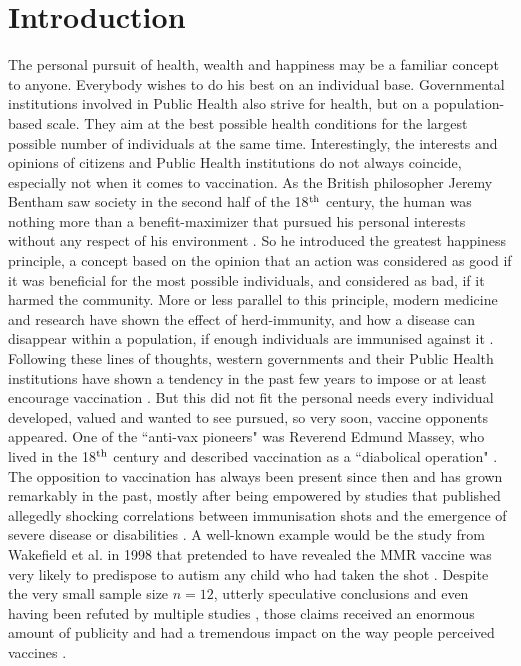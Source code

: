 \documentclass[12pt,a4paper,twoside]{article}
\begin{document}
\newpage

\listoffigures

\newpage

\section{Introduction}

The personal pursuit of health, wealth and happiness may be a familiar concept to anyone. Everybody wishes to do his best on an individual base. Governmental institutions involved in Public Health also strive for health, but on a population-based scale. They aim at the best possible health conditions for the largest possible number of individuals at the same time. Interestingly, the interests and opinions of citizens and Public Health institutions do not always coincide, especially not when it comes to vaccination. As the British philosopher Jeremy Bentham saw society in the second half of the 18$^{\textnormal{th}}$ century, the human was nothing more than a benefit-maximizer that pursued his personal interests without any respect of his environment \cite{Bentham1988}. So he introduced the greatest happiness principle, a concept based on the opinion that an action was considered as good if it was beneficial for the most possible individuals, and considered as bad, if it harmed the community. More or less parallel to this principle, modern medicine and research have shown the effect of herd-immunity, and how a disease can disappear within a population, if enough individuals are immunised against it \cite{Gordis2014}. Following these lines of thoughts, western governments and their Public Health institutions have shown a tendency in the past few years to impose or at least encourage vaccination \cite{KBV2019, Drew2019}. But this did not fit the personal needs every individual developed, valued and wanted to see pursued, so very soon, vaccine opponents appeared. One of the ``anti-vax pioneers" was Reverend Edmund Massey, who lived in the 18$^{\textnormal{th}}$ century and described vaccination as a ``diabolical operation" \cite{MASSEY2018}. The opposition to vaccination has always been present since then and has grown remarkably in the past, mostly after being empowered by studies that published allegedly shocking correlations between immunisation shots and the emergence of severe disease or disabilities \cite{Rao2011}. A well-known example would be the study from Wakefield et al. in 1998 that pretended to have revealed the \ac{MMR} vaccine was very likely to predispose to autism any child who had taken the shot \cite{Wakefield1998}. Despite the very small sample size $n = 12$, utterly speculative conclusions and even having been refuted by multiple studies \cite{DeStefano2013, Dales2001, Taylor1999}, those claims received an enormous amount of publicity and had a tremendous impact on the way people perceived vaccines \cite{Rao2011}.\newline
\end{document}
